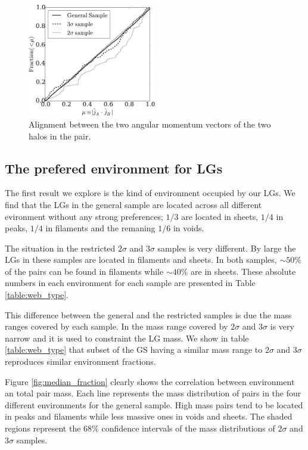 \documentclass{emulateapj}
\begin{document}
\begin{figure}
\begin{center}
  \includegraphics[width=0.50\textwidth]{fig6.pdf}
\end{center}
\caption{Alignment between the two angular momentum vectors of the two
  halos in the pair.
    \label{fig:jj_alignment}}  
\end{figure}



\subsection{The prefered environment for LGs}

The first result we explore is the kind of environment occupied by
our LGs. 
We find that the LGs in the general sample are located across
all different evironment without any strong preferences; $1/3$  are
located in sheets, $1/4$ in peaks, $1/4$ in filaments and the remaning
$1/6$ in voids. 

The situation in the restricted $2\sigma$ and $3\sigma$ samples is very
different. 
By large the LGs in these samples are located in filaments and sheets. 
In both samples, $\sim 50\%$ of the pairs can be found in filaments
while $\sim 40\%$ are in sheets. 
These absolute numbers in each environment for each sample are
presented in Table \ref{table:web_type}.  

This difference between the general and the restricted samples is
due the mass ranges covered by each sample. 
In \citet{lganalogues} the mass range covered by $2\sigma$ and $3\sigma$ 
is very narrow and it is used to constraint the LG mass.
We show  in table \ref{table:web_type} that subset of the GS
having a similar mass range to $2\sigma$ and $3\sigma$ reproduces  
similar environment fractions.

Figure \ref{fig:median_fraction} clearly shows the correlation between
environment an total pair mass.
Each line represents the mass distribution of pairs in the four
different environments for the general sample.
High mass pairs tend to be located in  peaks and filaments while less
massive ones in voids and sheets. 
The shaded regions represent the $68\%$ confidence intervals of the mass 
distributions of $2\sigma$ and $3\sigma$ samples.
\end{document}
